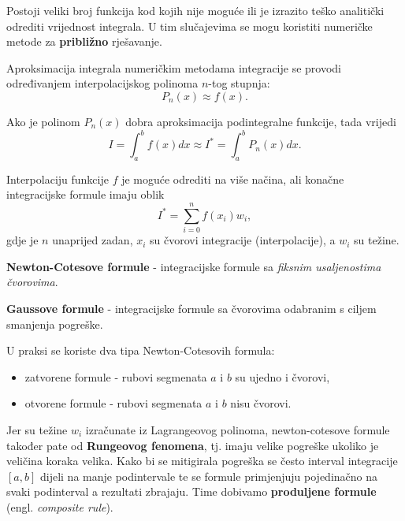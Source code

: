 Postoji veliki broj funkcija kod kojih nije moguće ili je izrazito teško
analitički odrediti vrijednost integrala. U tim slučajevima se mogu koristiti
numeričke metode za \textbf{približno} rješavanje.

Aproksimacija integrala numeričkim metodama integracije se provodi određivanjem
interpolacijskog polinoma $n$-tog stupnja:
$$
P_n(x) \approx f(x).
$$

Ako je polinom $P_n(x)$ dobra aproksimacija podintegralne funkcije, tada vrijedi
$$
I = \int_a^b f(x) dx \approx I^* = \int_a^b P_n(x) dx.
$$

Interpolaciju funkcije $f$ je moguće odrediti na više načina, ali konačne
integracijske formule imaju oblik
$$
I^* = \sum_{i=0}^n f(x_i) w_i,
$$
gdje je $n$ unaprijed zadan, $x_i$ su čvorovi integracije (interpolacije), a
$w_i$ su težine.

\bigskip

\textbf{Newton-Cotesove formule} - integracijske formule sa \textit{fiksnim usaljenostima čvorovima}.

\textbf{Gaussove formule} - integracijske formule sa čvorovima odabranim s ciljem smanjenja pogreške.

\bigskip
\noindent
U praksi se koriste dva tipa Newton-Cotesovih formula:
\begin{itemize}
    \item zatvorene formule - rubovi segmenata $a$ i $b$ su ujedno i čvorovi,
    \item otvorene formule - rubovi segmenata $a$ i $b$ nisu čvorovi.
\end{itemize}

\bigskip
\noindent
Jer su težine $w_i$ izračunate iz Lagrangeovog polinoma, newton-cotesove formule
također pate od \textbf{Rungeovog fenomena}, tj. imaju velike pogreške ukoliko
je veličina koraka velika. Kako bi se mitigirala pogreška se često interval
integracije $[a,b]$ dijeli na manje podintervale te se formule primjenjuju
pojedinačno na svaki podinterval a rezultati zbrajaju. Time dobivamo
\textbf{produljene formule} (engl. \textit{composite rule}).
